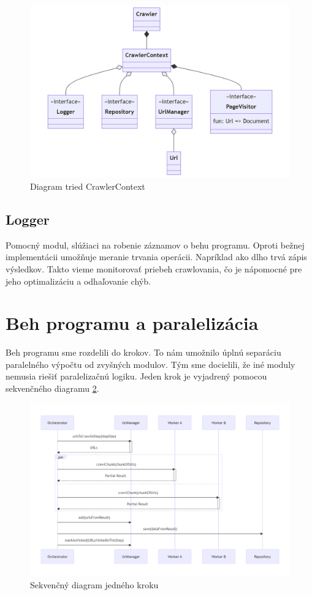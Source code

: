\begin{figure}[!ht]
    \centering
    \includegraphics[width=1\textwidth]{figures/classDiagramContext.png}
    \caption{Diagram tried CrawlerContext\label{o:classDiagramContextManual}}
\end{figure}


\subsection{Logger}
Pomocný modul, slúžiaci na robenie záznamov o behu programu. Oproti bežnej implementácii umožňuje meranie trvania operácii. Napríklad ako dlho trvá zápis výsledkov. Takto vieme monitorovať priebeh crawlovania, čo je nápomocné pre jeho optimalizáciu a odhaľovanie chýb.



\section{Beh programu a paralelizácia}
Beh programu sme rozdelili do krokov. To nám umožnilo úplnú separáciu paralelného výpočtu od zvyšných modulov. Tým sme docielili, že iné moduly nemusia riešiť paralelizačnú logiku. Jeden krok je vyjadrený pomocou sekvenčného diagramu \ref{o:seqStepManual}.

\begin{figure}[!ht]
    \centering
    \includegraphics[width=1\textwidth]{figures/seqDiagCrawlStep.png}
    \caption{Sekvenčný diagram jedného kroku\label{o:seqStepManual}}
\end{figure}

